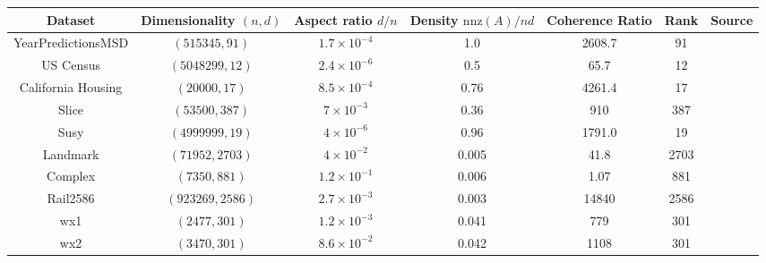 \documentclass[twoside]{article}
\newcommand{\nnz}[1]{\text{nnz}(#1)}
\theoremstyle{definition}\newtheorem{thm}{Theorem}[section]
\theoremstyle{definition}\newtheorem{mydef}[thm]{Definition}
\theoremstyle{definition}\newtheorem{rem}[thm]{Remark}
\theoremstyle{definition}\newtheorem{prop}[thm]{Proposition}
\theoremstyle{definition}\newtheorem{example}[thm]{Example}
\theoremstyle{definition}\newtheorem{claim}[thm]{Claim}
\theoremstyle{definition}\newtheorem{Qu}[thm]{Question}
\theoremstyle{definition}\newtheorem{Lemma}[thm]{Lemma}
\theoremstyle{definition}\newtheorem{Cor}[thm]{Corollary}
\theoremstyle{definition}\newtheorem{Fact}[]{Fact}
\begin{document}
\begin{table}[ht]
\centering
\begin{adjustbox}{width=1\textwidth}

\begin{tabular}{|c|c|c|c|c|c|c|}
  \hline
Dataset                   & Dimensionality  $(n,d)$      &   Aspect ratio $d/n$ & Density $\nnz{A}/nd$ &  Coherence Ratio & Rank & Source \\
\hline
YearPredictionsMSD       & $(515345,91)$         &   $1.7 \times 10^{-4} $      & 1.0                  &  2608.7                 &  91   &  \cite{Dua:2017}             \\
US Census                & $(5048299, 12)$         & $2.4 \times 10^{-6}$       &
0.5                 &    65.7           &  12 &  \cite{census2000}\\
California Housing       & $(20000, 17)$         &   $8.5 \times 10^{-4} $      &  0.76                 & 4261.4                 & 17    &   \cite{geron2017hands}      \\


  Slice                   & $(53500, 387)$         &   $7 \times 10^{-3} $      &  0.36                 &                          910                 & 387    &   \cite{Dua:2017}       \\


Susy            & $(4999999, 19)$         &   $4 \times 10^{-6} $      &  0.96                 & 1791.0                & 19    &   \cite{Dua:2017}       \\

Landmark        & $(71952, 2703)$         &   $4 \times 10^{-2} $      &  0.005                 & 41.8                & 2703    &   \cite{davis2011university}      \\

Complex       & $(7350, 881)$         &   $1.2 \times 10^{-1} $      &  0.006                 & 1.07                & 881    &   \cite{davis2011university}      \\


Rail2586                 & $(923269, 2586)$      &   $2.7 \times 10^{-3} $      &  0.003                &  14840                & 2586    &   \cite{davis2011university} \\

wx1 & $(2477, 301)$    & $1.2 \times 10^{-3}$ & 0.041 & 779 & 301 & \cite{platt199912} \\

wx2 & $(3470, 301)$    & $8.6 \times 10^{-2}$ & 0.042 & 1108 & 301 & \cite{platt199912} \\


\end{tabular}
\end{adjustbox}
\end{table}
\end{document}
